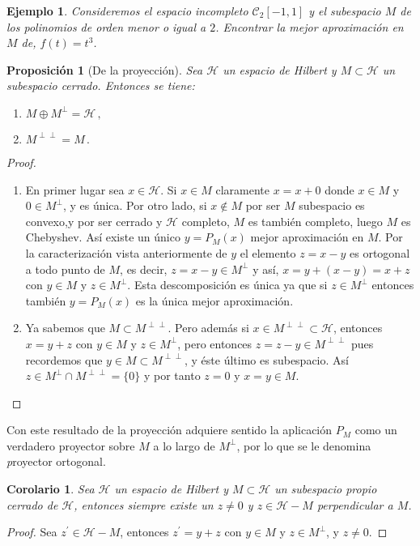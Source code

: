 \documentclass[12pt]{book}
\newtheorem{ejemplo}{\bf Ejemplo}[chapter]
\newtheorem{prop}{\bf Proposición}[chapter]
\newtheorem{coro}{Corolario}[chapter]
\begin{document}
  
\begin{ejemplo}  Consideremos el espacio incompleto $\mathcal{C}_2[-1,1]$ y el subespacio $M$ de los polinomios  de orden menor o igual a $2$. Encontrar la mejor aproximación en $M$  de, $f(t)=t^3$.
\end{ejemplo}
\begin{prop}[De la proyección] Sea $\mathcal{H}$ un espacio de Hilbert y $M\subset \mathcal{H}$ un subespacio cerrado. Entonces se tiene:
\begin{enumerate}
\renewcommand{\labelenumi}{\alph{enumi})}
\item $M\oplus M^\perp =\mathcal{H}\,,$
\item
$M^{\perp\perp}=M\,.$
\end{enumerate}
\end{prop}
\begin{proof}
\begin{enumerate}
\renewcommand{\labelenumi}{\alph{enumi})}
\item En primer lugar  sea $x\in \mathcal{H}$. Si $x\in M$ claramente $x=x+0$ donde $x\in M$ y $0\in M^\perp$, y es única. Por otro lado, si $x\not\in M$ por ser $M$ subespacio es convexo,y por ser cerrado y $\mathcal{H}$ completo, $M$ es también completo, luego $M$ es Chebyshev. Así existe un único $y=P_M(x)$ mejor aproximación en $M$. Por la caracterización vista anteriormente de $y$  el elemento $z=x-y$ es ortogonal a todo punto de $M$, es decir,
$z=x-y\in M^\perp$ y así,
$x =y + (x-y)= x+z$ con $y\in M$ y $z\in M^\perp$. Esta descomposición es única ya que si $z\in M^\perp$ entonces también $y=P_M(x)$ es  la única mejor aproximación.
\item Ya sabemos que $M\subset M^{\perp\perp}$. Pero además si  $x\in M^{\perp\perp}\subset \mathcal{H}$, entonces $x= y +z$ con $y\in M$  y $z\in M^{\perp}$, pero entonces $z=z-y\in M^{\perp\perp}$ pues  recordemos  que $ y\in M\subset M^{\perp\perp}$, y éste último es subespacio. Así  $z\in M^\perp\cap M^{\perp\perp}=\{0\}$ y por tanto $z=0$  y $x=y\in M$. 
\end{enumerate}
\end{proof} Con este resultado de la proyección adquiere sentido   la aplicación $P_M$ como un verdadero proyector sobre $M$ a lo largo de $M^\perp$, por lo que se le denomina {\emph proyector ortogonal}.
\begin{coro}Sea $\mathcal{H}$ un espacio de Hilbert y $M\subset \mathcal{H}$ un subespacio propio cerrado de $\mathcal{H}$, entonces siempre existe un  $z\not=0$ y $z\in \mathcal{H}-M$ perpendicular a $M$.
\end{coro}
\begin{proof}
Sea $z^\prime \in \mathcal{H}- M$, entonces $z^\prime=y+z$ con  $y\in M$  y $z\in M^\perp$, y $z\not=0$.
\end{proof}
\end{document}
